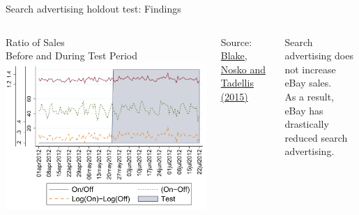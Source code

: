 \documentclass[10pt, aspectratio=169]{beamer}
\newcommand{\source}[1]{\begin{flushright} \footnotesize Source: {#1} \end{flushright} \normalsize}
\begin{document}
\begin{frame}{Search advertising holdout test: Findings}
\begin{columns}
\centering
Ratio of Sales \\ Before and During Test Period\\
\includegraphics[width=\textwidth]{images/blakeetalresult.png}\\
\source{\href{https://github.com/eleafeit/ad_response_tutorial/blob/master/Papers/BlakeNoskoTadelis2015ConsumerHeterogeneityandPaidSearchEffectiveness.pdf}{Blake, Nosko and Tadellis (2015)}}
\alert{Search advertising does not increase eBay sales. \\ As a result, eBay has drastically reduced search advertising.}
\end{columns}
\end{frame}
\end{document}
